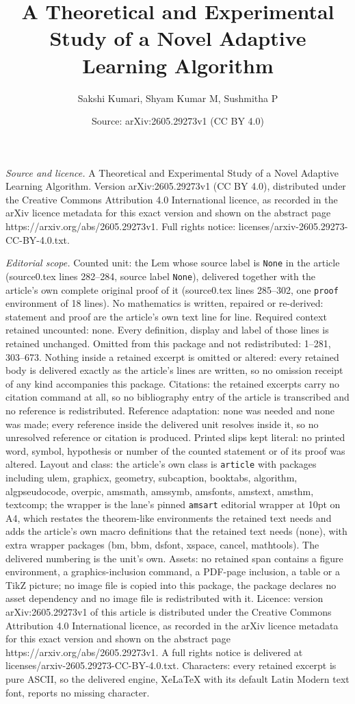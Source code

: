 \documentclass[10pt,a4paper]{amsart}
\title[A Theoretical and Experimental Study of a Novel Adaptive Lea]{A Theoretical and Experimental Study of a Novel Adaptive Learning Algorithm}
\author{Sakshi Kumari, Shyam Kumar M, Sushmitha P}
\date{Source: arXiv:2605.29273v1 (CC BY 4.0)}
\begin{document}
\maketitle

\noindent\emph{Source and licence.} A Theoretical and Experimental Study of a Novel Adaptive Learning Algorithm. Version arXiv:2605.29273v1 (CC BY 4.0), distributed under the Creative Commons Attribution 4.0 International licence, as recorded in the arXiv licence metadata for this exact version and shown on the abstract page https://arxiv.org/abs/2605.29273v1. Full rights notice: licenses/arxiv-2605.29273-CC-BY-4.0.txt.\par\smallskip

\noindent\textit{Editorial scope.} Counted unit: the Lem whose source label is \texttt{None} in the article (source0.tex lines 282--284, source label \texttt{None}), delivered together with the article's own complete original proof of it (source0.tex lines 285--302, one \texttt{proof} environment of 18 lines). No mathematics is written, repaired or re-derived: statement and proof are the article's own text line for line. Required context retained uncounted: none. Every definition, display and label of those lines is retained unchanged. Omitted from this package and not redistributed: 1--281, 303--673. Nothing inside a retained excerpt is omitted or altered: every retained body is delivered exactly as the article's lines are written, so no omission receipt of any kind accompanies this package. Citations: the retained excerpts carry no citation command at all, so no bibliography entry of the article is transcribed and no reference is redistributed. Reference adaptation: none was needed and none was made; every reference inside the delivered unit resolves inside it, so no unresolved reference or citation is produced. Printed slips kept literal: no printed word, symbol, hypothesis or number of the counted statement or of its proof was altered. Layout and class: the article's own class is \texttt{article} with packages including ulem, graphicx, geometry, subcaption, booktabs, algorithm, algpseudocode, overpic, amsmath, amssymb, amsfonts, amstext, amsthm, textcomp; the wrapper is the lane's pinned \texttt{amsart} editorial wrapper at 10pt on A4, which restates the theorem-like environments the retained text needs and adds the article's own macro definitions that the retained text needs (none), with extra wrapper packages (bm, bbm, dsfont, xspace, cancel, mathtools). The delivered numbering is the unit's own. Assets: no retained span contains a figure environment, a graphics-inclusion command, a PDF-page inclusion, a table or a TikZ picture; no image file is copied into this package, the package declares no asset dependency and no image file is redistributed with it. Licence: version arXiv:2605.29273v1 of this article is distributed under the Creative Commons Attribution 4.0 International licence, as recorded in the arXiv licence metadata for this exact version and shown on the abstract page https://arxiv.org/abs/2605.29273v1. A full rights notice is delivered at licenses/arxiv-2605.29273-CC-BY-4.0.txt. Characters: every retained excerpt is pure ASCII, so the delivered engine, XeLaTeX with its default Latin Modern text font, reports no missing character.
\end{document}
